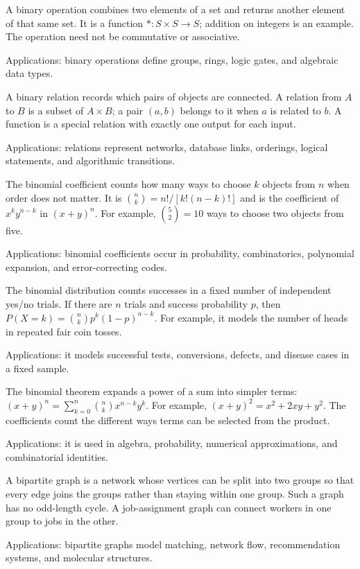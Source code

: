 A binary operation combines two elements of a set and returns another element of that same set. It is a function $*:S\times S\to S$; addition on integers is an example. The operation need not be commutative or associative. \par\noindent Applications: binary operations define groups, rings, logic gates, and algebraic data types.

A binary relation records which pairs of objects are connected. A relation from $A$ to $B$ is a subset of $A\times B$; a pair $(a,b)$ belongs to it when $a$ is related to $b$. A function is a special relation with exactly one output for each input. \par\noindent Applications: relations represent networks, database links, orderings, logical statements, and algorithmic transitions.

The binomial coefficient counts how many ways to choose $k$ objects from $n$ when order does not matter. It is $\binom nk=n!/[k!(n-k)!]$ and is the coefficient of $x^ky^{n-k}$ in $(x+y)^n$. For example, $\binom52=10$ ways to choose two objects from five. \par\noindent Applications: binomial coefficients occur in probability, combinatorics, polynomial expansion, and error-correcting codes.

The binomial distribution counts successes in a fixed number of independent yes/no trials. If there are $n$ trials and success probability $p$, then $P(X=k)=\binom nkp^k(1-p)^{n-k}$. For example, it models the number of heads in repeated fair coin tosses. \par\noindent Applications: it models successful tests, conversions, defects, and disease cases in a fixed sample.

The binomial theorem expands a power of a sum into simpler terms: $(x+y)^n=\sum_{k=0}^n\binom nkx^{n-k}y^k$. For example, $(x+y)^2=x^2+2xy+y^2$. The coefficients count the different ways terms can be selected from the product. \par\noindent Applications: it is used in algebra, probability, numerical approximations, and combinatorial identities.

A bipartite graph is a network whose vertices can be split into two groups so that every edge joins the groups rather than staying within one group. Such a graph has no odd-length cycle. A job-assignment graph can connect workers in one group to jobs in the other. \par\noindent Applications: bipartite graphs model matching, network flow, recommendation systems, and molecular structures.

